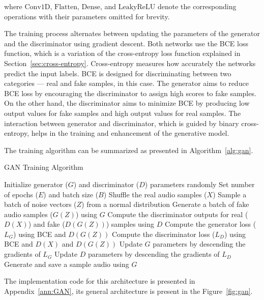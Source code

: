 where $\text{Conv1D}$, $\text{Flatten}$, $\text{Dense}$, and $\text{LeakyReLU}$ denote the corresponding operations with their parameters omitted for brevity.

The training process alternates between updating the parameters of the generator and the discriminator using gradient descent. Both networks use the \ac{BCE} loss function, which is a variation of the cross-entropy loss function explained in Section~\ref{sec:cross-entropy}. Cross-entropy measures how accurately the networks predict the input labels. \Ac{BCE} is designed for discriminating between two categories — real and fake samples, in this case. The generator aims to reduce \ac{BCE} loss by encouraging the discriminator to assign high scores to fake samples. On the other hand, the discriminator aims to minimize \ac{BCE} by producing low output values for fake samples and high output values for real samples. The interaction between generator and discriminator, which is guided by binary cross-entropy, helps in the training and enhancement of the generative model.

The training algorithm can be summarized as presented in Algorithm~\ref{alg:gan}.

\begin{algorithm}
\caption{\ac{GAN} Training Algorithm}
\label{alg:gan}
\begin{algorithmic}[1]
\State Initialize generator ($G$) and discriminator ($D$) parameters randomly
\State Set number of epochs ($E$) and batch size ($B$)
\State Shuffle the real audio samples ($X$)
\State Sample a batch of noise vectors ($Z$) from a normal distribution
\State Generate a batch of fake audio samples ($G(Z)$) using $G$
\State Compute the discriminator outputs for real ($D(X)$) and fake ($D(G(Z))$) samples using $D$
\State Compute the generator loss ($L_G$) using BCE and $D(G(Z))$
\State Compute the discriminator loss ($L_D$) using BCE and $D(X)$ and $D(G(Z))$
\State Update $G$ parameters by descending the gradients of $L_G$
\State Update $D$ parameters by descending the gradients of $L_D$
\EndFor
\State Generate and save a sample audio using $G$
\EndFor
\end{algorithmic}
\end{algorithm}


The implementation code for this architecture is presented in Appendix~\ref{ann:GAN}, its general architecture is present in the Figure~\ref{fig:gan}.


